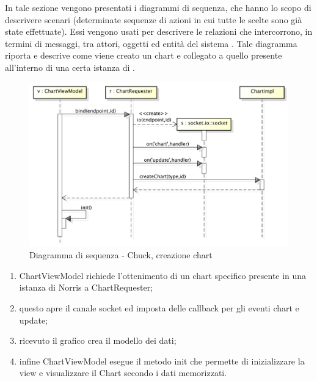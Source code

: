         In tale sezione vengono presentati i diagrammi di sequenza, che hanno lo scopo di descrivere scenari (determinate sequenze di azioni in cui tutte le scelte sono già state effettuate). Essi vengono usati per descrivere le relazioni che intercorrono, in termini di messaggi, tra attori, oggetti ed entità del sistema .
             Tale diagramma riporta e descrive come viene creato un chart e collegato a quello presente all'interno di una certa istanza di .
            \begin{figure}[H]
                \centering
                \includegraphics[scale=0.3]{DefinizioneDiProdotto/Pics/ChuckInserimentoChart}
                \caption{Diagramma di sequenza - Chuck, creazione chart}
            \end{figure}
            \begin{enumerate}
                \item ChartViewModel richiede l'ottenimento di un chart specifico presente in una istanza di Norris a ChartRequester;
                \item questo apre il canale socket ed imposta delle callback per gli eventi chart e update;
                \item ricevuto il grafico crea il modello dei dati;
                \item infine ChartViewModel esegue il metodo init che permette di inizializzare la view e visualizzare il Chart secondo i dati memorizzati.
            \end{enumerate}

